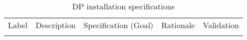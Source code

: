 \begin{footnotesize}
\begin{longtable}{p{}p{}p{}p{}p{}}
\caption{DP installation specifications  } \\
  \rowcolor{dunesky}
       Label & Description  & Specification \newline (Goal) & Rationale & Validation \\  \colhline









\label{tab:specs:DP-INST}
\end{longtable}
\end{footnotesize}